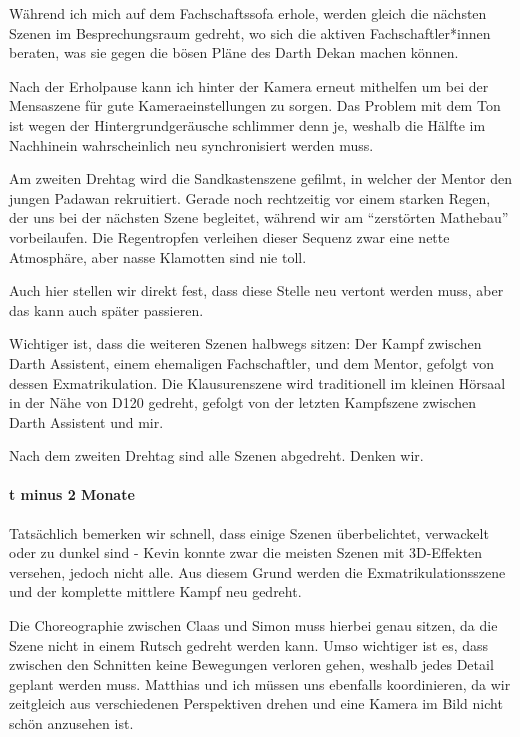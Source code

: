 {    Während ich mich auf dem Fachschaftssofa erhole, werden gleich die nächsten
    Szenen im Besprechungsraum gedreht, wo sich die aktiven Fachschaftler*innen
    beraten, was sie gegen die bösen Pläne des Darth Dekan machen können.


    Nach der Erholpause kann ich hinter der Kamera erneut mithelfen um bei der
    Mensaszene für gute Kameraeinstellungen zu sorgen. Das Problem mit dem Ton ist
    wegen der Hintergrundgeräusche schlimmer denn je, weshalb die Hälfte im
    Nachhinein wahrscheinlich neu synchronisiert werden muss.

    Am zweiten Drehtag wird die Sandkastenszene gefilmt, in welcher der Mentor den
    jungen Padawan rekruitiert. Gerade noch rechtzeitig vor einem starken Regen,
    der uns bei der nächsten Szene begleitet, während wir am \enquote{zerstörten
        Mathebau}
    vorbeilaufen. Die Regentropfen verleihen dieser Sequenz zwar eine nette
    Atmosphäre, aber nasse Klamotten sind nie toll.


    Auch hier stellen
    wir direkt fest, dass diese Stelle neu vertont werden muss, aber das kann auch
    später passieren.


    Wichtiger ist, dass die weiteren Szenen halbwegs sitzen: Der Kampf zwischen
    Darth Assistent, einem ehemaligen Fachschaftler, und dem Mentor, gefolgt von dessen
    Exmatrikulation. Die Klausurenszene wird traditionell im kleinen Hörsaal in der
    Nähe von D120 gedreht, gefolgt von der letzten Kampfszene zwischen Darth
    Assistent  und
    mir.


    Nach dem zweiten Drehtag sind alle Szenen abgedreht. Denken wir.
    \paragraph{t minus 2 Monate}
    Tatsächlich bemerken wir schnell, dass einige Szenen überbelichtet,
    verwackelt oder zu dunkel sind - Kevin konnte zwar die meisten Szenen mit
    3D-Effekten versehen, jedoch nicht alle. Aus diesem Grund werden die
    Exmatrikulationsszene und der komplette mittlere Kampf neu gedreht.


    Die Choreographie zwischen Claas und Simon muss hierbei genau sitzen, da die
    Szene nicht in einem Rutsch gedreht werden kann. Umso wichtiger ist es, dass
    zwischen den Schnitten keine Bewegungen verloren gehen, weshalb jedes Detail
    geplant werden muss. Matthias und ich müssen uns ebenfalls koordinieren, da
    wir zeitgleich aus verschiedenen Perspektiven drehen und eine Kamera im Bild
    nicht schön anzusehen ist.


}
